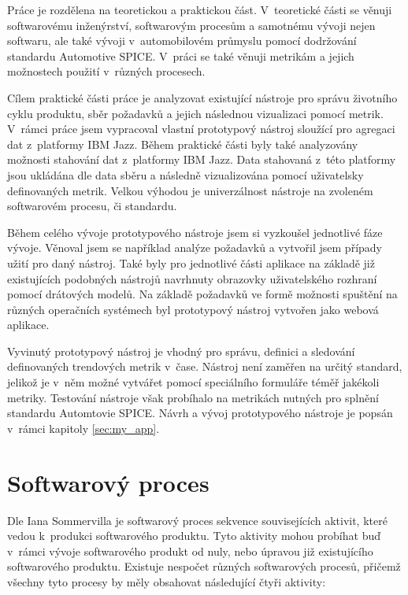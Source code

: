 \documentclass[czech,master]{diploma}
\begin{document}
Práce je rozdělena na teoretickou a praktickou část. V~teoretické části se věnuji softwarovému inženýrství, softwarovým procesům a samotnému vývoji nejen softwaru, ale také vývoji v~automobilovém průmyslu pomocí dodržování standardu Automotive SPICE. V~práci se také věnuji metrikám a jejich možnostech použití v~různých procesech.

Cílem praktické části práce je analyzovat existující nástroje pro správu životního cyklu produktu, sběr požadavků a jejich následnou vizualizaci pomocí metrik. V~rámci práce jsem vypracoval vlastní prototypový nástroj sloužící pro agregaci dat z~platformy IBM Jazz. Během praktické části byly také analyzovány možnosti stahování dat z~platformy IBM Jazz. Data stahovaná z~této platformy jsou ukládána dle data sběru a následně vizualizována pomocí uživatelsky definovaných metrik. Velkou výhodou je univerzálnost nástroje na zvoleném softwarovém procesu, či standardu.

Během celého vývoje prototypového nástroje jsem si vyzkoušel jednotlivé fáze vývoje. Věnoval jsem se například analýze požadavků a vytvořil jsem případy užití pro daný nástroj. Také byly pro jednotlivé části aplikace na základě již existujících podobných nástrojů navrhnuty obrazovky uživatelského rozhraní pomocí drátových modelů. Na základě požadavků ve formě možnosti spuštění na různých operačních systémech byl prototypový nástroj vytvořen jako webová aplikace.

Vyvinutý prototypový nástroj je vhodný pro správu, definici a sledování definovaných trendových metrik v~čase. Nástroj není zaměřen na určitý standard, jelikož je v~něm možné vytvářet pomocí speciálního formuláře téměř jakékoli metriky. Testování nástroje však probíhalo na metrikách nutných pro splnění standardu Automtovie SPICE. Návrh a vývoj prototypového nástroje je popsán v~rámci kapitoly \ref{sec:my_app}.

\chapter{Softwarový proces}
\label{sec:sw_process}

Dle Iana Sommervilla \cite{ref:sommerrville_sw_process} je softwarový proces sekvence souvisejících aktivit, které vedou k~produkci softwarového produktu. Tyto aktivity mohou probíhat buď v~rámci vývoje softwarového produkt od nuly, nebo úpravou již existujícího softwarového produktu. Existuje nespočet různých softwarových procesů, přičemž všechny tyto procesy by měly obsahovat následující čtyři aktivity:
\end{document}
